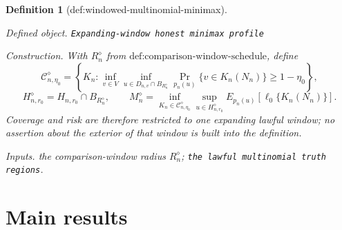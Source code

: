 \documentclass{article}
\newtheorem{definition}{Definition}
\begin{document}
\begin{definition}[def:windowed-multinomial-minimax]\label{def:windowed-multinomial-minimax}
\par\smallskip\noindent\emph{Defined object.} \texttt{Expanding-\allowbreak{}window honest minimax profile}
\par\smallskip\noindent\emph{Construction.} With \(R_n^{\diamond}\) from \(\text{def:comparison-window-schedule}\), define
\[
 \mathcal C_{n,\eta_0}^{\diamond}
 =\left\{K_n:\inf_{v\in V}\inf_{u\in D_{n,v}\cap B_{R_n^{\diamond}}}
 \Pr_{p_n(u)}\{v\in K_n(N_n)\}\ge1-\eta_0\right\},
\]
\[
 H_{n,r_0}^{\diamond}=H_{n,r_0}\cap B_{R_n^{\diamond}},
 \qquad
 M_n^{\diamond}=\inf_{K_n\in\mathcal C_{n,\eta_0}^{\diamond}}
 \sup_{u\in H_{n,r_0}^{\diamond}}
 E_{p_n(u)}[\ell_0\{K_n(N_n)\}].
\]
Coverage and risk are therefore restricted to one expanding lawful window; no assertion about the exterior of that window is built into the definition.
\par\smallskip\noindent\emph{Inputs.} the comparison-window radius \(R_n^{\diamond}\); \texttt{the lawful multinomial truth regions}.
\end{definition}

\section{Main results}
\end{document}
